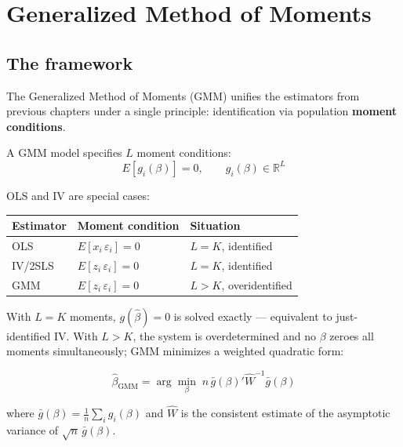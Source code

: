 \chapter{Generalized Method of Moments}
\label{cap:gmm}

\section{The framework}

The Generalized Method of Moments (GMM) unifies the estimators from previous
chapters under a single principle: identification via population \textbf{moment
conditions}.

A GMM model specifies $L$ moment conditions:
\[
  E\!\left[g_i(\beta)\right] = 0, \qquad g_i(\beta) \in \mathbb{R}^L
\]

OLS and IV are special cases:

\begin{center}
\begin{tabular}{lll}
\toprule
\textbf{Estimator} & \textbf{Moment condition} & \textbf{Situation} \\
\midrule
OLS   & $E[x_i\,\varepsilon_i] = 0$ & $L = K$, identified \\
IV/2SLS & $E[z_i\,\varepsilon_i] = 0$ & $L = K$, identified \\
GMM   & $E[z_i\,\varepsilon_i] = 0$ & $L > K$, overidentified \\
\bottomrule
\end{tabular}
\end{center}

With $L = K$ moments, $g(\hat\beta) = 0$ is solved exactly --- equivalent
to just-identified IV. With $L > K$, the system is overdetermined and no
$\beta$ zeroes all moments simultaneously; GMM minimizes a weighted
quadratic form:

\[
  \hat\beta_{\mathrm{GMM}}
  = \arg\min_\beta\; n\, \bar g(\beta)' \hat W^{-1} \bar g(\beta)
\]

where $\bar g(\beta) = \tfrac{1}{n}\sum_i g_i(\beta)$ and $\hat W$ is the
consistent estimate of the asymptotic variance of $\sqrt{n}\,\bar g(\beta)$.

